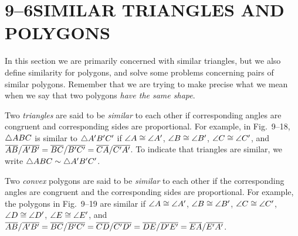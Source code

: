 \documentclass[11pt]{book}
\begin{document}
\section*{9--6\quad SIMILAR TRIANGLES AND POLYGONS}

In this section we are primarily concerned with similar triangles, but we also
define similarity for polygons, and solve some problems concerning pairs of
similar polygons. Remember that we are trying to make precise what we mean when
we say that two polygons \emph{have the same shape}.

\begin{definition}
Two \emph{triangles} are said to be \emph{similar} to each other if corresponding
angles are congruent and corresponding sides are proportional. For example, in
Fig.~9--18, $\triangle ABC$ is similar to $\triangle A'B'C'$ if $\angle A \cong \angle A'$,
$\angle B \cong \angle B'$, $\angle C \cong \angle C'$, and $\overline{AB}/\overline{A'B'} =
\overline{BC}/\overline{B'C'} = \overline{CA}/\overline{C'A'}$. To indicate that triangles are similar,
we write $\triangle ABC \sim \triangle A'B'C'$.
\end{definition}

Two \emph{convex} polygons are said to be \emph{similar} to each other if the
corresponding angles are congruent and the corresponding sides are proportional.
For example, the polygons in Fig.~9--19 are similar if $\angle A \cong \angle A'$,
$\angle B \cong \angle B'$, $\angle C \cong \angle C'$, $\angle D \cong \angle D'$,
$\angle E \cong \angle E'$, and $\overline{AB}/\overline{A'B'} = \overline{BC}/\overline{B'C'} =
\overline{CD}/\overline{C'D'} = \overline{DE}/\overline{D'E'} = \overline{EA}/\overline{E'A'}$.

\FIGIXEIGHTEENNINETEEN
\end{document}
